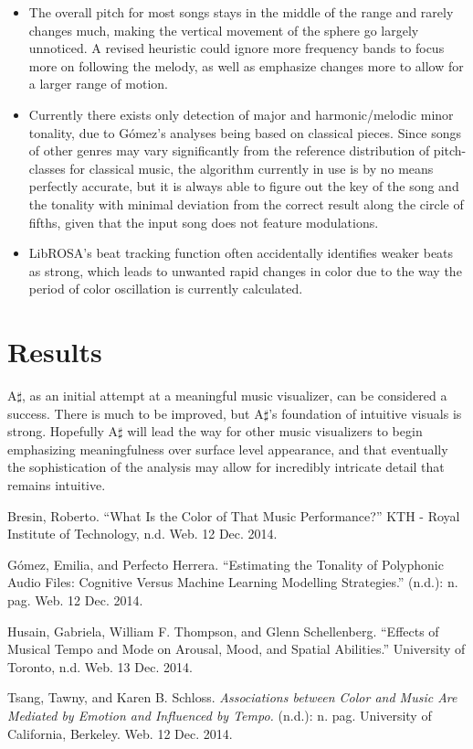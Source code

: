 \documentclass{article}
\begin{document}
\begin{itemize}
    \item The overall pitch for most songs stays in the middle of the range and rarely changes much, making the vertical movement of the sphere go largely unnoticed. A revised heuristic could ignore more frequency bands to focus more on following the melody, as well as emphasize changes more to allow for a larger range of motion.

    \item Currently there exists only detection of major and harmonic/melodic minor tonality, due to G\'{o}mez's \cite{gomez} analyses being based on classical pieces. Since songs of other genres may vary significantly from the reference distribution of pitch-classes for classical music, the algorithm currently in use is by no means perfectly accurate, but it is always able to figure out the key of the song and the tonality with minimal deviation from the correct result along the circle of fifths, given that the input song does not feature modulations.

    \item LibROSA's beat tracking function often accidentally identifies weaker beats as strong, which leads to unwanted rapid changes in color due to the way the period of color oscillation is currently calculated.
\end{itemize}

\section{Results}

A$\sharp$, as an initial attempt at a meaningful music visualizer, can be considered a success. There is much to be improved, but A$\sharp$'s foundation of intuitive visuals is strong. Hopefully A$\sharp$ will lead the way for other music visualizers to begin emphasizing meaningfulness over surface level appearance, and that eventually the sophistication of the analysis may allow for incredibly intricate detail that remains intuitive.

\begin{thebibliography}{9}

    Bresin, Roberto.
    ``What Is the Color of That Music Performance?''
    KTH - Royal Institute of Technology, n.d. Web. 12 Dec. 2014.

    G\'{o}mez, Emilia, and Perfecto Herrera.
    ``Estimating the Tonality of Polyphonic Audio Files: Cognitive Versus Machine Learning Modelling Strategies.''
    (n.d.): n. pag. Web. 12 Dec. 2014.

    Husain, Gabriela, William F. Thompson, and Glenn Schellenberg.
    ``Effects of Musical Tempo and Mode on Arousal, Mood, and Spatial Abilities.''
    University of Toronto, n.d. Web. 13 Dec. 2014.

    Tsang, Tawny, and Karen B. Schloss.
    \emph{Associations between Color and Music Are Mediated by Emotion and Influenced by Tempo.}
    (n.d.): n. pag.
    University of California, Berkeley. Web. 12 Dec. 2014.

\end{thebibliography}
\end{document}
